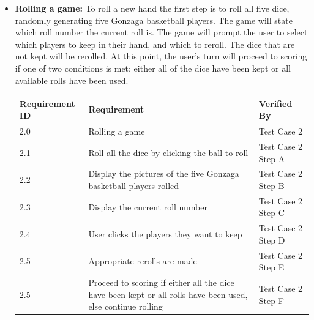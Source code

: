 \documentclass[]{report}   %
\begin{document}
\begin{itemize}
\item \textbf{Rolling a game:} To roll a new hand the first step is to roll all five dice, randomly generating five Gonzaga basketball players. The game will state which roll number the current roll is. The game will prompt the user to select which players to keep in their hand, and which to reroll. The dice that are not kept will be rerolled. At this point, the user's turn will proceed to scoring if one of two conditions is met: either all of the dice have been kept or all available rolls have been used. 
    \begin{center}
    \begin{tabular}{ | l | p{3.5in} | l | }
    \hline
    \textbf{Requirement ID} & \textbf{Requirement} & \textbf{Verified By} \\ \hline
    2.0 & Rolling a game& Test Case 2\\ \hline
    2.1 & Roll all the dice by clicking the ball to roll & Test Case 2 Step A\\ \hline
    2.2 & Display the pictures of the five Gonzaga basketball players rolled & Test Case 2 Step B\\ \hline
    2.3 & Display the current roll number & Test Case 2 Step C\\ \hline
    2.4 & User clicks the players they want to keep & Test Case 2 Step D\\ \hline
    2.5 & Appropriate rerolls are made & Test Case 2 Step E\\ \hline
    2.5 & Proceed to scoring if either all the dice have been kept or all rolls have been used, else continue rolling & Test Case 2 Step F\\ \hline
    \end{tabular}
    \end{center}
    
    \vspace{.5in}


\end{itemize}
\end{document}
